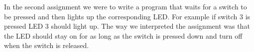 In the second assignment we were to write a program that waits for a switch to be pressed and then lights up the corresponding LED. For example if switch 3 is pressed LED 3 should light up. The way we interpreted the assignment was that the LED should stay on for as long as the switch is pressed down and turn off when the switch is released.
